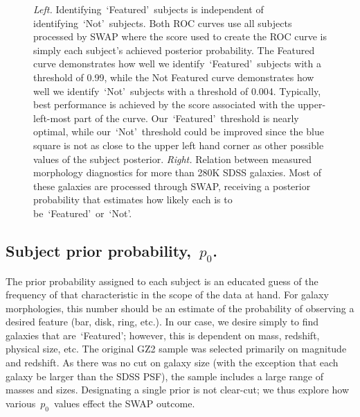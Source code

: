 \documentclass[twocolumn,  trackchanges, ]{aastex6}%
\newcommand{\p}{$p_0$}
\newcommand{\feat}{`Featured'}
\newcommand{\notfeat}{`Not'}
\begin{document}
\begin{figure}[t!]
\caption{\textit{Left.} Identifying~\feat~subjects is independent of identifying~\notfeat~subjects.  Both ROC curves use all subjects processed by SWAP where the score used to create the ROC curve is simply each subject's achieved posterior probability. The Featured curve demonstrates how well we identify~\feat~subjects with a threshold of 0.99, while the Not Featured curve demonstrates how well we identify~\notfeat~subjects with a threshold of 0.004. Typically, best performance is achieved by the score associated with the upper-left-most part of the curve. Our~\feat~threshold is nearly optimal, while our~\notfeat~threshold could be improved since the blue square is not as close to the upper left hand corner as other possible values of the subject posterior. \textit{Right.} Relation between measured morphology diagnostics for more than 280K SDSS galaxies. Most of these galaxies are processed through SWAP, receiving a posterior probability that estimates how likely each is to be~\feat~or~\notfeat.}
\label{fig: morph thresh}
\end{figure}


\subsection{Subject prior probability,~\p.}
The prior probability assigned to each subject is an educated guess of 
the frequency of that characteristic in the scope of the data at hand. 
For galaxy morphologies, this number should be an estimate of the probability
of observing a desired feature (bar, disk, ring, etc.). In our case, 
we desire simply to find galaxies that are~\feat; however, this is dependent 
on mass, redshift, physical size, etc. The original GZ2 sample was selected
primarily on magnitude and redshift.  As there was no cut on galaxy size
(with the exception that each galaxy be larger than the SDSS PSF), the sample
includes a large range of  masses and sizes. Designating a single prior is not clear-cut; 
we thus explore how various~\p~values effect the SWAP outcome.
\end{document}
